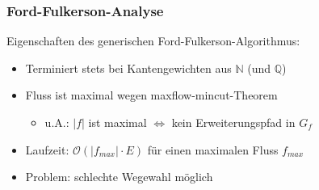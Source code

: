 \documentclass{beamer}
\newcommand{\ff}{Ford-Fulkerson}
\begin{document}
\begin{frame}
\frametitle{\ff-Analyse}
Eigenschaften des generischen \ff-Algorithmus:
\begin{itemize}
\item<1-> Terminiert stets bei Kantengewichten aus $\mathbb{N}$ (und $\mathbb{Q}$)
\item<2-> Fluss ist maximal wegen \alert{maxflow-mincut-Theorem} 
\begin{itemize}
\item u.A.: $\lvert f\rvert$ ist maximal $\Leftrightarrow$ kein Erweiterungspfad in $G_{f}$
\end{itemize}
\item<3-> Laufzeit: $\mathcal{O}(\lvert f_{max}\rvert \cdot E)$ für einen maximalen Fluss $f_{max}$
\item<4-> Problem: schlechte Wegewahl möglich
\end{itemize}
\end{frame}
\end{document}
